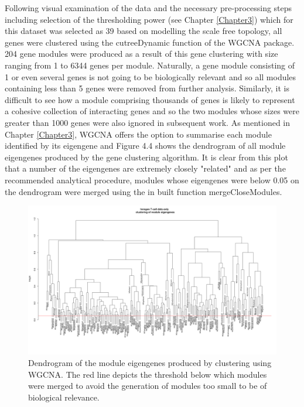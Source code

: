 Following visual examination of the data and the necessary pre-processing steps including selection of the thresholding power (see Chapter \ref{Chapter3}) which for this dataset was selected as 39 based on modelling the scale free topology, all genes were clustered using the cutreeDynamic function of the WGCNA package. 204 gene modules were produced as a result of this gene clustering with size ranging from 1 to 6344 genes per module. Naturally, a gene module consisting of 1 or even several genes is not going to be biologically relevant and so all modules containing less than 5 genes were removed from further analysis. Similarly, it is difficult to see how a module comprising thousands of genes is likely to represent a cohesive collection of interacting genes and so the two modules whose sizes were greater than 1000 genes were also ignored in subsequent work. As mentioned in Chapter \ref{Chapter3}, WGCNA offers the option to summarise each module identified by its eigengene and Figure 4.4 shows the dendrogram of all module eigengenes produced by the gene clustering algorithm. It is clear from this plot that a number of the eigengenes are extremely closely "related" and as per the recommended analytical procedure, modules whose eigengenes were below 0.05 on the dendrogram were merged using the in built function mergeCloseModules.

\begin{figure}[H] 
    \centering
\includegraphics[width=1\textwidth]{Figures/Chapter4/WGCNA/tcell_immgen_data_module_eigengene_clustering.png}
\caption{\small{Dendrogram of the module eigengenes produced by clustering using WGCNA. The red line depicts the threshold below which modules were merged to avoid the generation of modules too small to be of biological relevance. } }
    \label{fig:14}
\end{figure}


